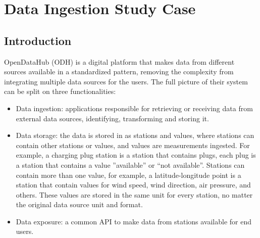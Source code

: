 

\newcommand{\sla}{\textbackslash}

\newcommand{\cmd}[1]{\textsf{#1}}

\newcommand{\pkg}[1]{\textsf{#1}}

\newcommand{\ltxcmd}[1]{\cmd{\sla{}#1}}

\chapter{Data Ingestion Study Case}
\label{chap:dataingestion}

\section{Introduction}
\label{sec:introductioning}
OpenDataHub (ODH) is a digital platform that makes data from different sources available in a standardized pattern, removing the complexity from integrating multiple data sources for the users. The full picture of their system can be split on three functionalities:

\begin{itemize}
    \item Data ingestion: applications responsible for retrieving or receiving data from external data sources, identifying, transforming and storing it.
    \item Data storage: the data is stored in as stations and values, where stations can contain other stations or values, and values are measurements ingested. For example, a charging plug station is a station that contains plugs, each plug is a station that contains a value ”available” or “not available”. Stations can contain more than one value, for example, a latitude-longitude point is a station that contain values for wind speed, wind direction, air pressure, and others. These values are stored in the same unit for every station, no matter the original data source unit and format.
    \item Data exposure: a common API to make data from stations available for end users.
\end{itemize}

